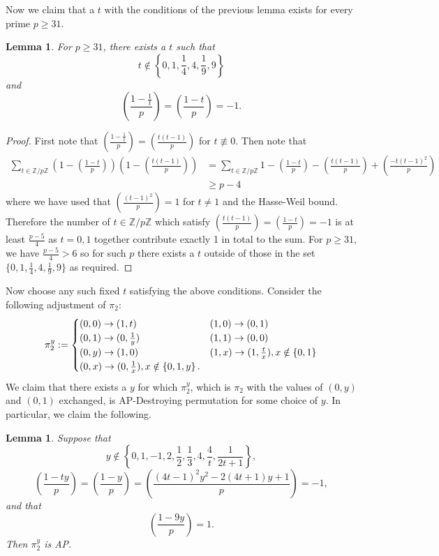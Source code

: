 \documentclass[12pt]{amsart}
\newtheorem{lemma}[thm]{Lemma}
\theoremstyle{definition}
\theoremstyle{remark}
\newcommand{\Z}{\mathbb Z}
\begin{document}
Now we claim that a $t$ with the conditions of the previous lemma exists for every prime $p\ge 31$. 
\begin{lemma}\label{Lemma2pPart2} 
For $p\ge 31$, there exists a $t$ such that  
\[t\not\in \left\{0,1,\frac{1}{4},4,\frac{1}{9},9\right\} \]
and
\[(\frac{1-\frac{1}{t}}{p})=(\frac{1-t}{p})=-1.\]
\end{lemma}
\begin{proof}
First note that $(\frac{1-\frac{1}{t}}{p})=(\frac{t(t-1)}{p})$ for $t\nequiv 0$. Then note that
\begin{align*}
\sum_{t\in \Z/p\Z}(1-(\frac{1-t}{p}))(1-(\frac{t(t-1)}{p}))
&= \sum_{t\in \Z/p\Z}1-(\frac{1-t}{p})-(\frac{t(t-1)}{p})+(\frac{-t(t-1)^2}{p})
\\& \ge p-4
\end{align*}
where we have used that $(\frac{(t-1)^2}{p})=1$ for $t\neq 1$ and the Hasse-Weil bound. Therefore the number of $t\in \Z/p\Z$ which satisfy $(\frac{t(t-1)}{p})=(\frac{1-t}{p})=-1$ is at least $\frac{p-5}{4}$ as $t=0, 1$ together contribute exactly 1 in total to the sum. For $p\ge31$, we have $\frac{p-5}{4}>6$ so for such $p$ there exists a $t$ outside of those in the set $\{0,1,\frac{1}{4},4,\frac{1}{9},9\}$ as required. 
\end{proof}
 Now choose any such fixed $t$ satisfying the above conditions. Consider the following adjustment of $\pi_2$:
\[\pi_2^y :=  \setlength{\arraycolsep}{0pt}
  \renewcommand{\arraystretch}{1.2}
  \left\{\begin{array}{l @{\quad} l}
       (0, 0)\to (1, t) & (1, 0)\to (0, 1)
       \\(0, 1)\to (0, \frac{1}{y}) & (1, 1)\to (0,0)
       \\(0, y)\to (1, 0) & (1, x)\to (1, \frac{t}{x}), x\notin\left\{0, 1\right\}
       \\ (0, x)\to (0, \frac{1}{x}), x\notin\left\{0, 1,y\right\}.
  \end{array}\right.\]
 We claim that there exists a $y$ for which $\pi_2^y$, which is $\pi_2$ with the values of $(0, y)$ and $(0, 1)$ exchanged, is AP-Destroying permutation for some choice of $y$. In particular, we claim the following.
 \begin{lemma}
Suppose that 
\[y\not\in\left\{0,1,-1,2, \frac{1}{2},\frac{1}{3}, 4, \frac{4}{t}, \frac{1}{2t+1}\right\},\]
\[(\frac{1-ty}{p})=(\frac{1-y}{p})=(\frac{(4t-1)^2y^2-2(4t+1)y+1}{p})=-1,\] and that \[(\frac{1-9y}{p})=1.\]
Then $\pi_2^y$ is AP.
 \end{lemma}
\end{document}

